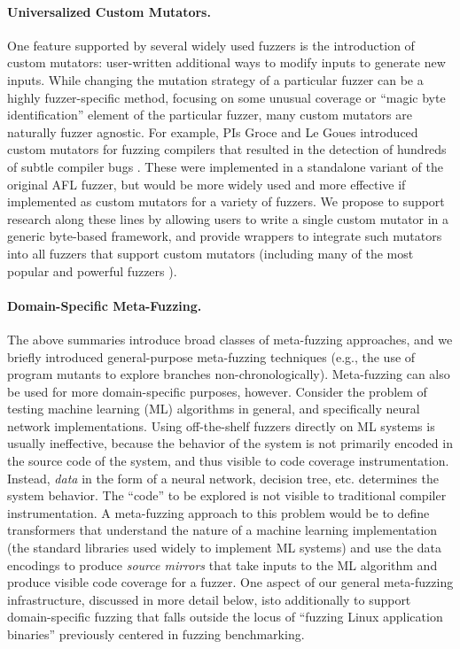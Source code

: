 \paragraph{Universalized Custom Mutators.}  One feature supported by several 
widely used fuzzers is the introduction of custom mutators:  user-written 
additional ways to modify inputs to generate new inputs.  While changing the 
mutation strategy of a particular fuzzer can be a highly fuzzer-specific 
method, focusing on some unusual coverage or ``magic byte identification'' 
element of the particular fuzzer, many custom mutators are naturally fuzzer 
agnostic.  For example, PIs Groce and Le Goues introduced custom mutators for 
fuzzing compilers that resulted in the detection of hundreds of subtle compiler 
bugs \cite{cc2022}.  These were implemented in a standalone variant of the 
original AFL fuzzer, but would be more widely used and more effective if 
implemented as custom mutators for a variety of fuzzers.  We propose to support 
research along these lines by allowing users to write a single custom mutator 
in a generic byte-based framework, and provide wrappers to integrate such 
mutators into all fuzzers that support custom mutators (including many of the 
most popular and powerful fuzzers ).
   
\paragraph{Domain-Specific Meta-Fuzzing.} The above summaries introduce 
broad classes of meta-fuzzing approaches, and we briefly introduced  
general-purpose meta-fuzzing techniques (e.g., the use of program mutants to 
explore branches non-chronologically).  Meta-fuzzing can also be used for more 
domain-specific purposes, however.  Consider the problem of testing machine 
learning (ML) algorithms in general, and specifically neural network 
implementations.  Using off-the-shelf fuzzers directly on ML systems is usually 
ineffective, because the behavior of the system is not primarily encoded in the 
source code of the system, and thus visible to code coverage instrumentation.  
Instead, \emph{data} in the form of a neural network, decision tree, etc. 
determines the system behavior.  The ``code'' to be explored is not visible to 
traditional compiler instrumentation.  A meta-fuzzing approach to this problem 
would be to define transformers that understand the nature of a machine 
learning implementation (the standard libraries used widely to implement ML 
systems) and use the data encodings to produce \emph{source mirrors} that take 
inputs to the ML algorithm and produce visible code coverage for a fuzzer.  One 
aspect of our general meta-fuzzing infrastructure, discussed in more detail 
below, isto additionally to support domain-specific fuzzing that falls outside 
the locus of ``fuzzing Linux application binaries'' previously centered in 
fuzzing benchmarking.


